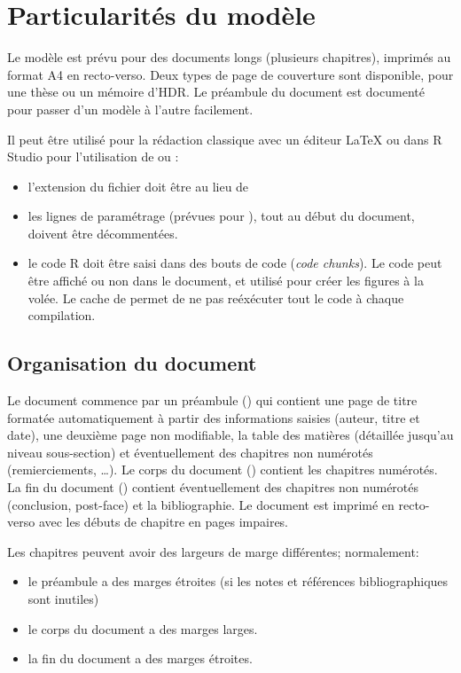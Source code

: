 \documentclass[
  a4paper, %
  11pt, extrafontsizes, %
  onecolumn, %
  openright, %
]{memoir}
\begin{document}
\section{Particularités du modèle}

Le modèle est prévu pour des documents longs (plusieurs chapitres), imprimés au format A4 en recto-verso.
Deux types de page de couverture sont disponible, pour une thèse ou un mémoire d'HDR. Le préambule du document est documenté pour passer d'un modèle à l'autre facilement. 

Il peut être utilisé pour la rédaction classique avec un éditeur \LaTeX{} ou dans R Studio pour l'utilisation de  ou :
\begin{itemize}
  \item l'extension du fichier doit être  au lieu de 
  \item les lignes de paramétrage (prévues pour ), tout au début du document, doivent être décommentées.
  \item le code R doit être saisi dans des bouts de code (\emph{\foreignlanguage{english}{code chunks}}). Le code peut être affiché ou non dans le document, et utilisé pour créer les figures à la volée. Le cache de  permet de ne pas reéxécuter tout le code à chaque compilation.
\end{itemize}


\subsection{Organisation du document}

Le document commence par un préambule () qui contient une page de titre formatée automatiquement à partir des informations saisies (auteur, titre et date), une deuxième page non modifiable, la table des matières (détaillée jusqu'au niveau sous-section) et éventuellement des chapitres non numérotés (remierciements, \dots). 
Le corps du document () contient les chapitres numérotés. 
La fin du document () contient éventuellement des chapitres non numérotés (conclusion, post-face) et la bibliographie. 
Le document est imprimé en recto-verso avec les débuts de chapitre en pages impaires.

Les chapitres peuvent avoir des largeurs de marge différentes; normalement:
\begin{itemize}
  \item le préambule a des marges étroites (si les notes et références bibliographiques sont inutiles)
  \item le corps du document a des marges larges.
  \item la fin du document a des marges étroites.
\end{itemize}
\end{document}
